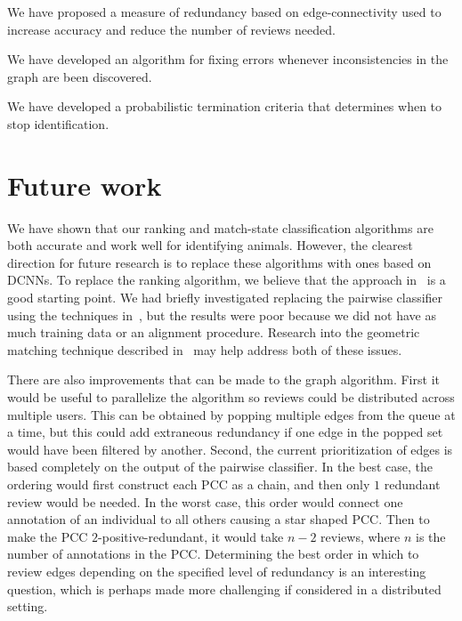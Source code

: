 \begin{enumln}
\begin{enumln}
        \item We have proposed a measure of redundancy based on edge-connectivity used to increase accuracy and
          reduce the number of reviews needed.

        \item We have developed an algorithm for fixing errors whenever inconsistencies in the graph are been
          discovered.

        \item We have developed a probabilistic termination criteria that determines when to stop identification.
        \end{enumln}
    \end{enumln}

    \section{Future work}\label{sec:futurework}

    We have shown that our ranking and match-state classification algorithms are both accurate and work well for
      identifying animals.
    However, the clearest direction for future research is to replace these algorithms with ones based on DCNNs.
    To replace the ranking algorithm, we believe that the approach in~\cite{arandjelovic_netvlad_2016} is a good
      starting point.
    We had briefly investigated replacing the pairwise classifier using the techniques
      in~\cite{taigman_deepface_2014}, but the results were poor because we did not have as much training data or
      an alignment procedure.
    Research into the geometric matching technique described in~\cite{rocco_convolutional_2017} may help address
      both of these issues.

    There are also improvements that can be made to the graph algorithm.
    First it would be useful to parallelize the algorithm so reviews could be distributed across multiple users.
    This can be obtained by popping multiple edges from the queue at a time, but this could add extraneous
      redundancy if one edge in the popped set would have been filtered by another.
    Second, the current prioritization of edges is based completely on the output of the pairwise classifier.
    In the best case, the ordering would first construct each PCC as a chain, and then only $1$ redundant review
      would be needed.
    In the worst case, this order would connect one annotation of an individual to all others causing a star
      shaped PCC.
    Then to make the PCC $2$-positive-redundant, it would take $n - 2$ reviews, where $n$ is the number of
      annotations in the PCC.
    Determining the best order in which to review edges depending on the specified level of redundancy is an
      interesting question, which is perhaps made more challenging if considered in a distributed setting.



